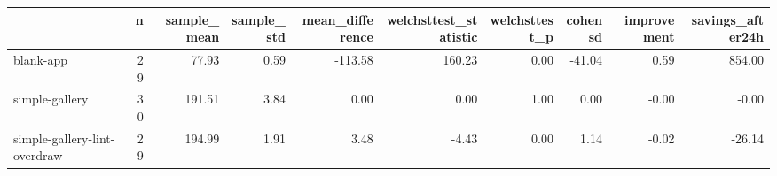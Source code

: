 \begin{tabular}{lrrrrrrrrr}
\toprule
{} &   n &  sample\_mean &  sample\_std &  mean\_difference &  welchsttest\_statistic &  welchsttest\_p &  cohensd &  improvement &  savings\_after24h \\
\midrule
blank-app                    &  29 &        77.93 &        0.59 &          -113.58 &                 160.23 &           0.00 &   -41.04 &         0.59 &            854.00 \\
simple-gallery               &  30 &       191.51 &        3.84 &             0.00 &                   0.00 &           1.00 &     0.00 &        -0.00 &             -0.00 \\
simple-gallery-lint-overdraw &  29 &       194.99 &        1.91 &             3.48 &                  -4.43 &           0.00 &     1.14 &        -0.02 &            -26.14 \\
\bottomrule
\end{tabular}
